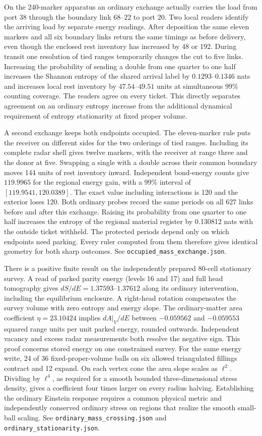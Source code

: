 \documentclass[11pt]{article}
\begin{document}
On the 240-marker apparatus an ordinary exchange actually carries the
load from port 38 through the boundary link \(68\)--\(22\) to
port 20. Two local readers identify the arriving load by separate
energy readings. After deposition the same eleven markers and all six
boundary links return the same timings as before delivery, even
though the enclosed rest inventory has increased by 48 or 192. During
transit one resolution of tied ranges temporarily changes the cut to
five links. Increasing the probability of sending a double from
one quarter to one half increases the Shannon entropy of the shared
arrival label by \(0.1293\)--\(0.1346\) nats and increases local
rest inventory by \(47.54\)--\(49.51\) units at simultaneous 99\%
counting coverage. The readers agree on every ticket. This directly
separates agreement on an ordinary entropy increase from the
additional dynamical requirement of entropy stationarity at fixed
proper volume.

A second exchange keeps both endpoints occupied. The eleven-marker
rule puts the receiver on different sides for the two orderings of
tied ranges. Including its complete radar shell gives twelve markers,
with the receiver at range three and the donor at five. Swapping a
single with a double across their common boundary moves 144 units
of rest inventory inward. Independent bond-energy counts give
\(119.9965\) for the regional energy gain, with a 99\% interval of
\([119.9541,120.0389]\). The exact value including interactions is
120 and the exterior loses 120. Both ordinary probes record the same
periods on all 627 links before and after this exchange. Raising its
probability from one quarter to one half increases the entropy of the
regional material register by 0.130812 nats with the outside ticket
withheld. The protected periods depend only on which endpoints need
parking. Every ruler computed from them therefore gives identical
geometry for both sharp outcomes. See \texttt{occupied\_mass\_exchange.json}.

There is a positive finite result on the independently prepared
80-cell stationary survey. A read of parked parity energy (levels
16 and 17) and full head tomography gives
\(dS/dE=1.37593\)--\(1.37612\) along its ordinary intervention,
including the equilibrium enclosure. A right-head rotation
compensates the survey volume with zero entropy and energy slope.
The ordinary-matter area coefficient \(\eta=23.10424\)
implies \(dA|_V/dE\) between \(-0.059562\) and \(-0.059553\)
squared range units per unit parked energy, rounded outwards.
Independent vacancy and excess radar measurements both resolve the
negative sign. This proof concerns stored energy on one constrained
survey. For the same energy write, 24 of 36 fixed-proper-volume
balls on six allowed triangulated fillings contract and 12 expand.
On each vertex cone the area slope scales as \(\ell^2\). Dividing by
\(\ell^4\), as required for a smooth bounded three-dimensional
stress density, gives a coefficient four times larger on every
radius halving. Establishing the ordinary Einstein response requires
a common physical metric and independently conserved ordinary stress
on regions that realize the smooth small-ball scaling. See
\texttt{ordinary\_mass\_crossing.json} and
\texttt{ordinary\_stationarity.json}.
\end{document}
